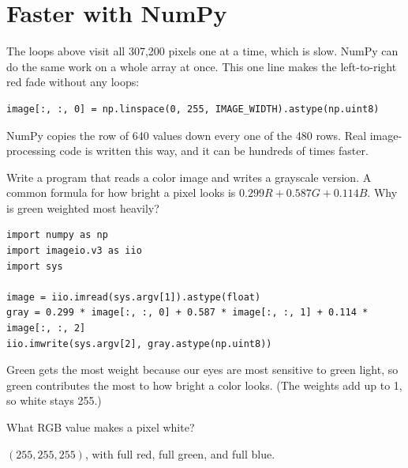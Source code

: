 \section{Faster with NumPy}
The loops above visit all 307,200 pixels one at a time, which is slow.
NumPy can do the same work on a whole array at once. This one line makes
the left-to-right red fade without any loops:
\begin{verbatim}
image[:, :, 0] = np.linspace(0, 255, IMAGE_WIDTH).astype(np.uint8)
\end{verbatim}
NumPy copies the row of 640 values down every one of the 480 rows. Real
image-processing code is written this way, and it can be hundreds of times
faster.

\begin{Exercise}[title={Grayscale}, label=img_gray]
Write a program that reads a color image and writes a grayscale version.
A common formula for how bright a pixel looks is
$0.299R + 0.587G + 0.114B$. Why is green weighted most heavily?
\end{Exercise}
\begin{Answer}[ref=img_gray]
\begin{verbatim}
import numpy as np
import imageio.v3 as iio
import sys

image = iio.imread(sys.argv[1]).astype(float)
gray = 0.299 * image[:, :, 0] + 0.587 * image[:, :, 1] + 0.114 * image[:, :, 2]
iio.imwrite(sys.argv[2], gray.astype(np.uint8))
\end{verbatim}
Green gets the most weight because our eyes are most sensitive to green
light, so green contributes the most to how bright a color looks. (The
weights add up to 1, so white stays 255.)
\end{Answer}

\begin{Exercise}[title={White Pixel}, label=img1]
What RGB value makes a pixel white?
\end{Exercise}
\begin{Answer}[ref=img1]
$(255, 255, 255)$, with full red, full green, and full blue.
\end{Answer}
